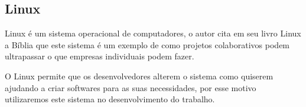 \newpage

\subsection{Linux}

Linux é um sistema operacional de computadores, o autor  cita em seu livro Linux a Bíblia que este sistema é um exemplo de como projetos colaborativos podem ultrapassar o que empresas individuais podem fazer.

O Linux permite que os desenvolvedores alterem o sistema como quiserem ajudando a criar softwares para as suas necessidades, por esse motivo utilizaremos este sistema no desenvolvimento do trabalho.
